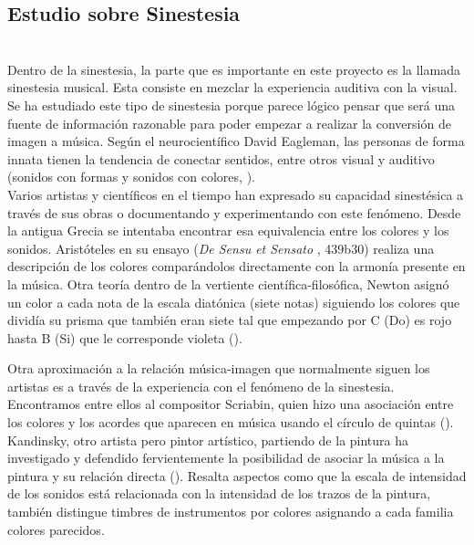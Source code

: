 \subsection{Estudio sobre Sinestesia}
\label{subsubsec:estudioSinestesia}

\\

Dentro de la sinestesia, la parte que es importante en este proyecto es la llamada sinestesia musical. Esta consiste en mezclar la experiencia auditiva con la visual. \color{blue}Se ha estudiado este tipo de sinestesia porque parece lógico pensar que será una fuente de información razonable para poder empezar a realizar la conversión de imagen a música. \color{black}
Según el neurocientífico David Eagleman, las personas de forma innata tienen la tendencia de conectar sentidos, entre otros visual y auditivo (sonidos con formas y sonidos con colores, \cite{VideoRedesFliparColores}).\\

Varios artistas y científicos en el tiempo han expresado su capacidad sinestésica a través de sus obras o documentando y experimentando con este fenómeno. Desde la antigua Grecia se intentaba encontrar esa equivalencia entre los colores y los sonidos. Aristóteles en su ensayo (\emph{De Sensu et Sensato} \cite{DeSensuEtSensato}, 439b30) realiza una descripción de los colores comparándolos directamente con la armonía presente en la música. \color{blue}Otra teoría dentro de la vertiente científica-filosófica, Newton asignó un color a cada nota de la escala diatónica (siete notas) siguiendo los colores que dividía su prisma que también eran siete tal que empezando por C (Do) es rojo hasta B (Si) que le corresponde violeta (\cite{OpticksNewton}).\\ \color{black}

Otra aproximación a la relación música-imagen que normalmente siguen los artistas es a través de la experiencia con el fenómeno de la sinestesia. Encontramos entre ellos al compositor Scriabin, quien hizo una asociación entre los colores y los acordes que aparecen en música usando el círculo de quintas (\cite{ScriabinQuintasColor}). Kandinsky, otro artista pero pintor artístico, partiendo de la pintura ha investigado y defendido fervientemente la posibilidad de asociar la música a la pintura y su relación directa (\cite{ConcerningSpiritualArt}). \color{blue} Resalta aspectos como que la escala de intensidad de los sonidos está relacionada con la intensidad de los trazos de la pintura, también distingue timbres de instrumentos por colores asignando a cada familia colores parecidos.\\ \color{black}

